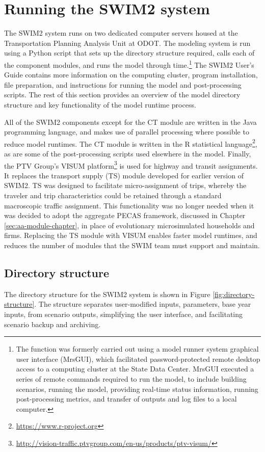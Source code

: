 \section{Running the SWIM2 system}
The SWIM2 system runs on two dedicated computer servers housed at the Transportation Planning Analysis Unit at ODOT. The modeling system is run using a Python script that sets up the directory structure required, calls each of the component modules, and runs the model through time.\footnote{The function was formerly carried out using a model runner system graphical user interface (MrsGUI), which facilitated password-protected remote desktop access to a computing cluster at the State Data Center. MrsGUI executed a series of remote commands required to run the model, to include building scenarios, running the model, providing real-time status information, running post-processing metrics, and transfer of outputs and log files to a local computer.} The SWIM2 User's Guide contains more information on the computing cluster, program installation, file preparation, and instructions for running the model and post-processing scripts. The rest of this section provides an overview of the model directory structure and key functionality of the model runtime process.

All of the SWIM2 components except for the CT module are written in the Java programming language, and makes use of parallel processing where possible to reduce model runtimes. The CT module is written in the R statistical language\footnote{\url{https://www.r-project.org}}, as are some of the post-processing scripts used elsewhere in the model. Finally, the PTV Group's VISUM platform\footnote{\url{http://vision-traffic.ptvgroup.com/en-us/products/ptv-visum/}} is used for highway and transit assignments. It replaces the transport supply (TS) module developed for earlier version of SWIM2. TS was designed to facilitate micro-assignment of trips, whereby the traveler and trip characteristics could be retained through a standard macroscopic traffic assignment. This functionality was no longer needed when it was decided to adopt the aggregate PECAS framework, discussed in Chapter \ref{sec:aa-module-chapter}, in place of evolutionary microsimulated households and firms. Replacing the TS module with VISUM enables faster model runtimes, and reduces the number of modules that the SWIM team must support and maintain.

\subsection{Directory structure}
The directory structure for the SWIM2 system is shown in Figure \ref{fig:directory-structure}. The structure separates user-modified inputs, parameters, base year inputs, from scenario outputs, simplifying the user interface, and facilitating scenario backup and archiving. 

